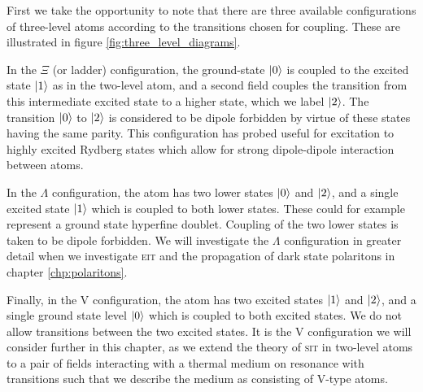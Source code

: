     First we take the opportunity to note that there are three available
    configurations of three-level atoms according to the transitions chosen for
    coupling. These are illustrated in figure \ref{fig:three_level_diagrams}.

    In the $\Xi$ (or ladder) configuration, the ground-state $\Ket{0}$ is
    coupled to the excited state $\Ket{1}$ as in the two-level atom, and a
    second field couples the transition from this intermediate excited state to
    a higher state, which we label $\Ket{2}$. The transition $\Ket{0}$ to
    $\Ket{2}$ is considered to be dipole forbidden by virtue of these states
    having the same parity. This configuration has probed useful for excitation
    to highly excited Rydberg states which allow for strong dipole-dipole
    interaction between atoms.\cite{Pritchard2010}

    In the $\Lambda$ configuration, the atom has two lower states $\Ket{0}$ and
    $\Ket{2}$, and a single excited state $\Ket{1}$ which is coupled to both
    lower states. These could for example represent a ground state hyperfine
    doublet. Coupling of the two lower states is taken to be dipole forbidden.
    We will investigate the $\Lambda$ configuration in greater detail when we
    investigate \textsc{eit} and the propagation of dark state polaritons in
    chapter \ref{chp:polaritons}.

    Finally, in the V configuration, the atom has two excited states $\Ket{1}$
    and $\Ket{2}$, and a single ground state level $\Ket{0}$ which is coupled to
    both excited states. We do not allow transitions between the two excited
    states. It is the V configuration we will consider further in this chapter,
    as we extend the theory of \textsc{sit} in two-level atoms to a pair of
    fields interacting with a thermal medium on resonance with transitions such
    that we describe the medium as consisting of V-type atoms.
